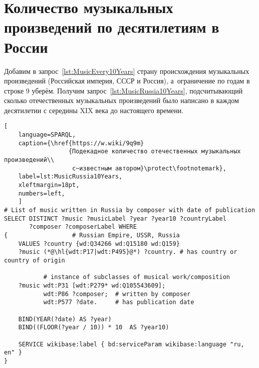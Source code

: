 


\section{Количество музыкальных произведений по десятилетиям в России}

Добавим в запрос~\ref{lst:MusicEvery10Years} страну происхождения 
музыкальных произведений (Российская империя, СССР и Россия), 
а~ограничение по годам в строке 9 уберём. 
Получим запрос~\ref{lst:MusicRussia10Years}, 
подсчитывающий сколько отечественных музыкальных произведений было написано 
в каждом десятилетии с середины XIX века до настоящего времени.


\newpage


\begin{lstlisting}[ 
    language=SPARQL,
    caption={\href{https://w.wiki/9q9m}
                  {Подекадное количество отечественных музыкальных произведений\\
                   с~известным автором}\protect\footnotemark},
    label=lst:MusicRussia10Years,
    xleftmargin=18pt,
    numbers=left,
    ]
# List of music written in Russia by composer with date of publication
SELECT DISTINCT ?music ?musicLabel ?year ?year10 ?countryLabel 
       ?composer ?composerLabel WHERE 
{                  # Russian Empire, USSR, Russia
    VALUES ?country {wd:Q34266 wd:Q15180 wd:Q159}
    ?music (*@\hl{wdt:P17|wdt:P495}@*) ?country. # has country or country of origin  
    
           # instance of subclasses of musical work/composition
    ?music wdt:P31 [wdt:P279* wd:Q105543609];
           wdt:P86 ?composer;  # written by composer
           wdt:P577 ?date.     # has publication date
    
    BIND(YEAR(?date) AS ?year)
    BIND((FLOOR(?year / 10)) * 10  AS ?year10)
    
    SERVICE wikibase:label { bd:serviceParam wikibase:language "ru, en" }
}
\end{lstlisting}%

